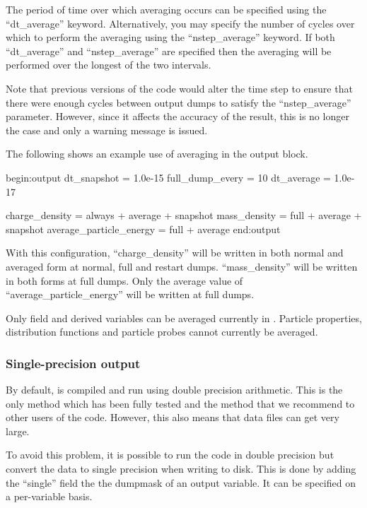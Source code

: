 The period of time over which averaging occurs can be specified using the
``dt\_average'' keyword. Alternatively, you may specify the number of cycles
over which to perform the averaging using the ``nstep\_average'' keyword.
If both ``dt\_average'' and ``nstep\_average'' are specified then the
averaging will be performed over the longest of the two intervals.

Note that previous versions of the code would alter the time step to
ensure that there were enough cycles between output dumps to satisfy the
``nstep\_average'' parameter. However, since it affects the accuracy of
the result, this is no longer the case and only a warning message is issued.

The following shows an example use of averaging in the output block.
\begin{boxverbatim}
begin:output
   dt_snapshot = 1.0e-15
   full_dump_every = 10
   dt_average = 1.0e-17

   charge_density = always + average + snapshot
   mass_density = full + average + snapshot
   average_particle_energy = full + average
end:output
\end{boxverbatim}

With this configuration, ``charge\_density'' will be written in both normal and
averaged form at normal, full and restart dumps. ``mass\_density'' will be
written in both forms at full dumps. Only the average value of
``average\_particle\_energy'' will be written at full dumps.

Only field and derived variables can be averaged currently in {\EPOCH}.
Particle properties, distribution functions and particle probes cannot
currently be averaged.

\subsubsection{Single-precision output}
\label{sec:single_precision_output}

By default, {\EPOCH} is compiled and run using double precision arithmetic.
This is the only method which has been fully tested and the method that
we recommend to other users of the code. However, this also means that
data files can get very large.

To avoid this problem, it is possible to run the code in double precision
but convert the data to single precision when writing to disk. This is done
by adding the ``single'' field the the dumpmask of an output variable.
It can be specified on a per-variable basis.

